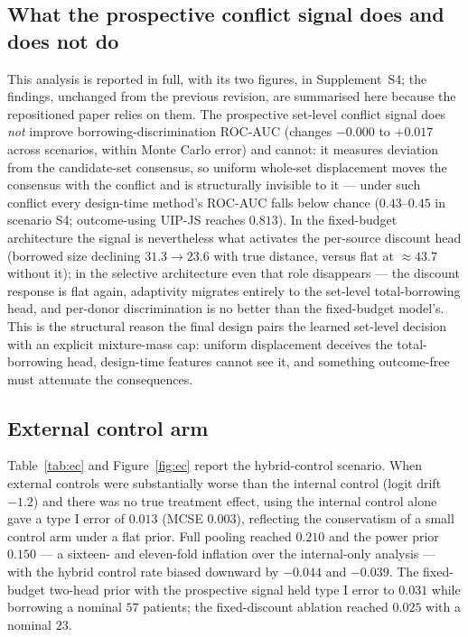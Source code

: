\documentclass[11pt]{article}
\begin{document}
\subsection{What the prospective conflict signal does and does not do}
\label{sec:prospective-results}

This analysis is reported in full, with its two figures, in
Supplement~S4; the findings, unchanged from the previous revision, are
summarised here because the repositioned paper relies on them. The
prospective set-level conflict signal does \emph{not} improve
borrowing-discrimination ROC-AUC (changes $-0.000$ to $+0.017$ across
scenarios, within Monte Carlo error) and cannot: it measures deviation
from the candidate-set consensus, so uniform whole-set displacement moves
the consensus with the conflict and is structurally invisible to it ---
under such conflict every design-time method's ROC-AUC falls below chance
($0.43$--$0.45$ in scenario S4; outcome-using UIP-JS reaches $0.813$). In
the fixed-budget architecture the signal is nevertheless what activates
the per-source discount head (borrowed size declining $31.3 \to 23.6$
with true distance, versus flat at $\approx 43.7$ without it); in the
selective architecture even that role disappears --- the discount
response is flat again, adaptivity migrates entirely to the set-level
total-borrowing head, and per-donor discrimination is no better than the
fixed-budget model's. This is the structural reason the final design
pairs the learned set-level decision with an explicit mixture-mass cap:
uniform displacement deceives the total-borrowing head, design-time
features cannot see it, and something outcome-free must attenuate the
consequences.

\subsection{External control arm}
\label{sec:ec-results}

Table~\ref{tab:ec} and Figure~\ref{fig:ec} report the hybrid-control scenario.
When external controls were substantially worse than the internal control
(logit drift $-1.2$) and there was no true treatment effect, using the internal
control alone gave a type I error of $0.013$ (MCSE $0.003$), reflecting the
conservatism of a small control arm under a flat prior. Full pooling reached
$0.210$ and the power prior $0.150$ --- a sixteen- and eleven-fold inflation
over the internal-only analysis --- with the hybrid
control rate biased downward by $-0.044$ and $-0.039$. The fixed-budget
two-head prior with
the prospective signal held type I error to $0.031$ while borrowing a nominal
$57$ patients; the fixed-discount ablation reached $0.025$ with a nominal $23$.
\end{document}
